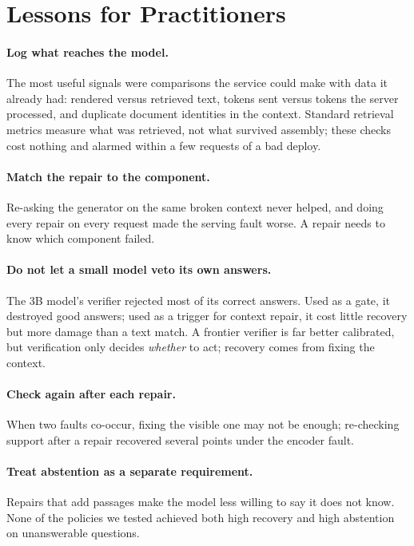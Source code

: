 \section{Lessons for Practitioners}\label{sec:lessons}

\paragraph{Log what reaches the model.} The most useful signals were comparisons the service could
make with data it already had: rendered versus retrieved text, tokens sent versus tokens the server
processed, and duplicate document identities in the context. Standard retrieval metrics measure
what was retrieved, not what survived assembly; these checks cost nothing and alarmed within a few
requests of a bad deploy.

\paragraph{Match the repair to the component.} Re-asking the generator on the same broken context
never helped, and doing every repair on every request made the serving fault worse. A repair needs
to know which component failed.

\paragraph{Do not let a small model veto its own answers.} The 3B model's verifier rejected most of
its correct answers. Used as a gate, it destroyed good answers; used as a trigger for context repair,
it cost little recovery but more damage than a text match. A frontier verifier is far better
calibrated, but verification only decides \emph{whether} to act; recovery comes from fixing the
context.

\paragraph{Check again after each repair.} When two faults co-occur, fixing the visible one may not
be enough; re-checking support after a repair recovered several points under the encoder fault.

\paragraph{Treat abstention as a separate requirement.} Repairs that add passages make the model
less willing to say it does not know. None of the policies we tested achieved both high recovery
and high abstention on unanswerable questions.

